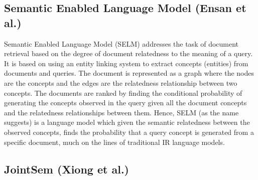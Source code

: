 \documentclass{article}
\begin{document}
\subsection{Semantic Enabled Language Model (Ensan et al.\cite{ensan2017document})}
\label{subsec:selm}

Semantic Enabled Language Model (SELM) addresses the task of document retrieval based on the degree of document relatedness to the meaning of a query. It is based on using an entity linking system to extract concepts (entities) from documents and queries. The document is represented as a graph where the nodes are the concepts and the edges are the relatedness relationship between two concepts. The documents are ranked by finding the conditional probability of generating the concepts observed in the query given all the document concepts and the relatedness relationships between them. Hence, SELM (as the name suggests) is a language model which given the semantic relatedness between the observed concepts, finds the probability that a query concept is generated from a specific document, much on the lines of traditional IR language models.

\subsection{JointSem (Xiong et al.\cite{xiong2017jointsem})}
\label{subsec:jointsem}
\end{document}
